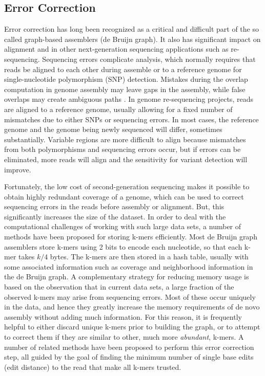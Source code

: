 \documentclass[11pt]{article}
\begin{document}
\subsection{Error Correction \label{ec}}
Error correction has long been recognized as a critical and difficult part of the so called graph-based assemblers (de Bruijn graph). It also has significant impact on alignment and in other next-generation sequencing applications such as re-sequencing. Sequencing errors complicate analysis, which normally requires that reads be aligned to each other during assemble or to a reference genome for single-nucleotide polymorphism (SNP) detection. Mistakes during the overlap computation in genome assembly may leave gaps in the assembly, while false overlaps may create ambiguous paths \cite{quake}. In genome re-sequencing projects, reads are aligned to a reference genome, usually allowing for a fixed number of mismatches due to either SNPs or sequencing errors. In most cases, the reference genome and the genome being newly sequenced will differ, sometimes substantially. Variable regions are more difficult to align because mismatches from both polymorphisms and sequencing errors occur, but if errors can be eliminated, more reads will align and the sensitivity for variant detection will improve.

Fortunately, the low cost of second-generation sequencing makes it possible to obtain highly redundant coverage of a genome, which can be used to correct sequencing errors in the reads before assembly or alignment. But, this significantly increases the size of the dataset. In order to deal with the computational challenges of working with such large data sets, a number of methods have been proposed for storing k-mers efficiently. Most de Bruijn graph assemblers store k-mers using 2 bits to encode each nucleotide, so that each k-mer takes $k/4$ bytes. The k-mers are then stored in a hash table, usually with some associated information such as coverage and neighborhood information in the de Bruijn graph. A complementary strategy for reducing memory usage is based on the observation that in current data sets, a large fraction of the observed k-mers may arise from sequencing errors. Most of these occur uniquely in the data, and hence they greatly increase the memory requirements of de novo assembly without adding much information. For this reason, it is frequently helpful to either discard unique k-mers prior to building the graph, or to attempt to correct them if they are similar to other, much more \emph{abundant}, k-mers. A number of related methods have been proposed to perform this error correction step, all guided by the goal of finding the minimum number of single base edits (edit distance) to the read that make all k-mers trusted.
\end{document}
